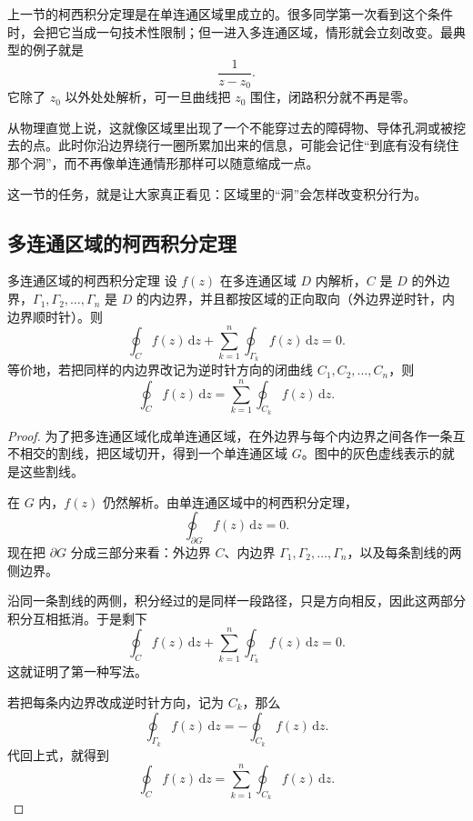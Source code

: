 \begin{wulibj}[为什么单连通条件不能随手丢掉]
上一节的柯西积分定理是在单连通区域里成立的。很多同学第一次看到这个条件时，会把它当成一句技术性限制；但一进入多连通区域，情形就会立刻改变。最典型的例子就是
\[
    \frac{1}{z-z_0}.
\]
它除了 $z_0$ 以外处处解析，可一旦曲线把 $z_0$ 围住，闭路积分就不再是零。

从物理直觉上说，这就像区域里出现了一个不能穿过去的障碍物、导体孔洞或被挖去的点。此时你沿边界绕行一圈所累加出来的信息，可能会记住``到底有没有绕住那个洞''，而不再像单连通情形那样可以随意缩成一点。

这一节的任务，就是让大家真正看见：区域里的``洞''会怎样改变积分行为。
\end{wulibj}

\subsection{多连通区域的柯西积分定理}

\begin{dingli}{多连通区域的柯西积分定理}{}
设 $f(z)$ 在多连通区域 $D$ 内解析，$C$ 是 $D$ 的外边界，$\Gamma_1,\Gamma_2,\ldots,\Gamma_n$ 是 $D$ 的内边界，并且都按区域的正向取向（外边界逆时针，内边界顺时针）。则
\[
    \oint_C f(z)\,\mathrm{d}z + \sum_{k=1}^{n} \oint_{\Gamma_k} f(z)\,\mathrm{d}z = 0.
\]
等价地，若把同样的内边界改记为逆时针方向的闭曲线 $C_1,C_2,\ldots,C_n$，则
\[
    \oint_C f(z)\,\mathrm{d}z = \sum_{k=1}^{n} \oint_{C_k} f(z)\,\mathrm{d}z.
\]
\end{dingli}

\begin{proof}
为了把多连通区域化成单连通区域，在外边界与每个内边界之间各作一条互不相交的割线，把区域切开，得到一个单连通区域 $G$。图中的灰色虚线表示的就是这些割线。

在 $G$ 内，$f(z)$ 仍然解析。由单连通区域中的柯西积分定理，
\[
    \oint_{\partial G} f(z)\,\mathrm{d}z = 0.
\]
现在把 $\partial G$ 分成三部分来看：外边界 $C$、内边界 $\Gamma_1,\Gamma_2,\ldots,\Gamma_n$，以及每条割线的两侧边界。

沿同一条割线的两侧，积分经过的是同样一段路径，只是方向相反，因此这两部分积分互相抵消。于是剩下
\[
    \oint_C f(z)\,\mathrm{d}z + \sum_{k=1}^{n} \oint_{\Gamma_k} f(z)\,\mathrm{d}z = 0.
\]
这就证明了第一种写法。

若把每条内边界改成逆时针方向，记为 $C_k$，那么
\[
    \oint_{\Gamma_k} f(z)\,\mathrm{d}z = -\oint_{C_k} f(z)\,\mathrm{d}z.
\]
代回上式，就得到
\[
    \oint_C f(z)\,\mathrm{d}z = \sum_{k=1}^{n} \oint_{C_k} f(z)\,\mathrm{d}z.
\]
\end{proof}

